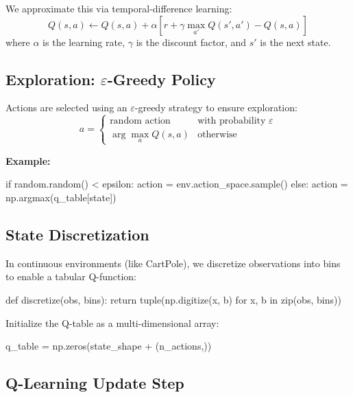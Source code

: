 \documentclass{article}
\begin{document}
We approximate this via temporal-difference learning:
\begin{equation}
    Q(s,a) \leftarrow Q(s,a) + \alpha \left[ r + \gamma \max_{a'} Q(s',a') - Q(s,a) \right]
\end{equation}
where $\alpha$ is the learning rate, $\gamma$ is the discount factor, and $s'$ is the next state.

\subsection{Exploration: $\varepsilon$-Greedy Policy}

Actions are selected using an $\varepsilon$-greedy strategy to ensure exploration:
\begin{equation}
    a =
    \begin{cases}
        \text{random action} & \text{with probability } \varepsilon \\
        \arg\max_a Q(s,a) & \text{otherwise}
    \end{cases}
\end{equation}

\vspace{0.5em}
\noindent\textbf{Example:}
\begin{python}
if random.random() < epsilon:
    action = env.action_space.sample()
else:
    action = np.argmax(q_table[state])
\end{python}

\subsection{State Discretization}

In continuous environments (like CartPole), we discretize observations into bins to enable a tabular Q-function:

\begin{python}
def discretize(obs, bins):
    return tuple(np.digitize(x, b) for x, b in zip(obs, bins))
\end{python}

Initialize the Q-table as a multi-dimensional array:
\begin{python}
q_table = np.zeros(state_shape + (n_actions,))
\end{python}

\subsection{Q-Learning Update Step}
\end{document}
